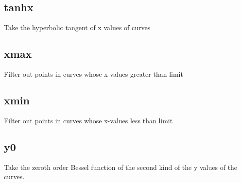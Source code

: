\documentclass[letterpaper,10pt,english]{sphinxmanual}
\begin{document}
\subsection{tanhx}
\label{\detokenize{math_operations:tanhx}}
Take the hyperbolic tangent of x values of curves

\begin{sphinxVerbatim}[commandchars=\\\{\}]
\PYG{p}{[}\PYG{p}{]}  
\end{sphinxVerbatim}


\subsection{xmax}
\label{\detokenize{math_operations:xmax}}
Filter out points in curves whose x-values greater than limit

\begin{sphinxVerbatim}[commandchars=\\\{\}]
\PYG{p}{[}\PYG{p}{]}   
\end{sphinxVerbatim}


\subsection{xmin}
\label{\detokenize{math_operations:xmin}}
Filter out points in curves whose x-values less than limit

\begin{sphinxVerbatim}[commandchars=\\\{\}]
\PYG{p}{[}\PYG{p}{]}   
\end{sphinxVerbatim}


\subsection{y0}
\label{\detokenize{math_operations:y0}}
Take the zeroth order Bessel function of the second kind of the y values of the curves.

\begin{sphinxVerbatim}[commandchars=\\\{\}]
\PYG{p}{[}\PYG{p}{]}  
\end{sphinxVerbatim}
\end{document}
